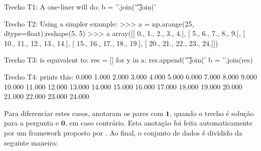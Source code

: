 \begin{tcolorbox}[colframe=orange!75!black,colback=gray!15!white,fonttitle=\bfseries,adjusted title=\large{Título da questão: convert 2d numpy array to string}~\ref{foot:exemplo-stackoverflow-mais-de-um-trecho}]
\begin{mypythongreen}{Trecho T1: A one-liner will do:}
b = '\n'.join('\t'.join('%
\end{mypythongreen}

\begin{mypythonred}{Trecho T2: Using a simpler example:}
>>> a = np.arange(25, dtype=float).reshape(5, 5)
>>> a
array([[  0.,   1.,   2.,   3.,   4.],
       [  5.,   6.,   7.,   8.,   9.],
       [ 10.,  11.,  12.,  13.,  14.],
       [ 15.,  16.,  17.,  18.,  19.],
       [ 20.,  21.,  22.,  23.,  24.]])
\end{mypythonred}
\begin{mypythongreen}{Trecho T3: is equivalent to:}
res = []
for y in a:
    res.append('\t'.join('%
b = '\n'.join(res)
\end{mypythongreen}
\begin{mypythonred}{Trecho T4: prints this:}
0.000   1.000   2.000   3.000   4.000
5.000   6.000   7.000   8.000   9.000
10.000  11.000  12.000  13.000  14.000
15.000  16.000  17.000  18.000  19.000
20.000  21.000  22.000  23.000  24.000
\end{mypythonred}
\end{tcolorbox}






Para diferenciar estes casos, \cite{yao-2018} anotaram os pares com $\bm{1}$, quando o trecho é solução para a pergunta e $\bm{0}$, em caso contrário. Esta anotação foi feita automaticamente por um framework proposto por \cite{yao-2018}. Ao final, o conjunto de dados é dividido da seguinte maneira:


